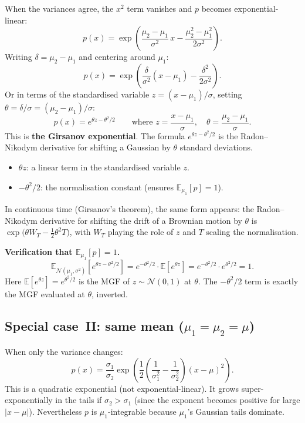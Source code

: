 \documentclass[11pt,a4paper]{article}
\newcommand{\N}{\mathcal{N}}
\newcommand{\E}{\mathbb{E}}
\begin{document}
When the variances agree, the $x^2$ term vanishes and $p$ becomes exponential-linear:
\[
  p(x)=\exp\!\left(\frac{\mu_2-\mu_1}{\sigma^2}\,x-\frac{\mu_2^2-\mu_1^2}{2\sigma^2}\right).
\]
Writing $\delta=\mu_2-\mu_1$ and centering around $\mu_1$:
\[
  p(x)=\exp\!\left(\frac{\delta}{\sigma^2}(x-\mu_1)-\frac{\delta^2}{2\sigma^2}\right).
\]
Or in terms of the standardised variable $z=(x-\mu_1)/\sigma$, setting
$\theta=\delta/\sigma=(\mu_2-\mu_1)/\sigma$:
\[
  \boxed{p(x)=e^{\theta z-\theta^2/2}}
  \qquad\text{where }z=\frac{x-\mu_1}{\sigma},\quad\theta=\frac{\mu_2-\mu_1}{\sigma}.
\]
This is \textbf{the Girsanov exponential}.  The formula $e^{\theta z-\theta^2/2}$ is the
Radon--Nikodym derivative for shifting a Gaussian by $\theta$ standard deviations.
\begin{itemize}
  \item $\theta z$: a linear term in the standardised variable $z$.
  \item $-\theta^2/2$: the normalisation constant (ensures $\E_{\mu_1}[p]=1$).
\end{itemize}

In continuous time (Girsanov's theorem), the same form appears: the Radon--Nikodym derivative
for shifting the drift of a Brownian motion by $\theta$ is
$\exp\!\bigl(\theta W_T-\tfrac{1}{2}\theta^2 T\bigr)$, with $W_T$ playing the role of $z$ and
$T$ scaling the normalisation.

\medskip\noindent\textbf{Verification that $\E_{\mu_1}[p]=1$.}
\[
  \E_{\N(\mu_1,\sigma^2)}\!\left[e^{\theta z-\theta^2/2}\right]
  =e^{-\theta^2/2}\cdot\E\!\left[e^{\theta z}\right]
  =e^{-\theta^2/2}\cdot e^{\theta^2/2}=1.
\]
Here $\E[e^{\theta z}]=e^{\theta^2/2}$ is the MGF of $z\sim\N(0,1)$ at $\theta$.
The $-\theta^2/2$ term is exactly the MGF evaluated at $\theta$, inverted.

\subsection{Special case~II: same mean ($\mu_1=\mu_2=\mu$)}

When only the variance changes:
\[
  p(x)=\frac{\sigma_1}{\sigma_2}
       \exp\!\left(\frac{1}{2}\!\left(\frac{1}{\sigma_1^2}-\frac{1}{\sigma_2^2}\right)(x-\mu)^2\right).
\]
This is a quadratic exponential (not exponential-linear).  It grows super-exponentially in the
tails if $\sigma_2>\sigma_1$ (since the exponent becomes positive for large $|x-\mu|$).
Nevertheless $p$ is $\mu_1$-integrable because $\mu_1$'s Gaussian tails dominate.
\end{document}
